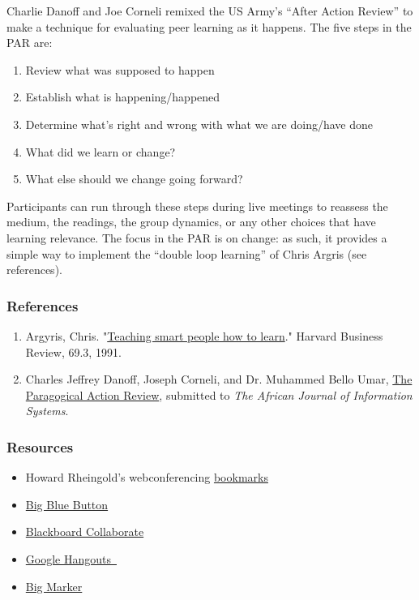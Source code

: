 Charlie Danoff and Joe Corneli remixed the US Army's ``After Action
Review'' to make a technique for evaluating peer learning as it happens.
The five steps in the PAR are:

\begin{enumerate}
\item
  Review what was supposed to happen
\item
  Establish what is happening/happened
\item
  Determine what's right and wrong with what we are doing/have done
\item
  What did we learn or change?
\item
  What else should we change going forward?
\end{enumerate}

Participants can run through these steps during live meetings to
reassess the medium, the readings, the group dynamics, or any other
choices that have learning relevance. The focus in the PAR is on change:
as such, it provides a simple way to implement the ``double loop
learning'' of Chris Argris (see references).

\subsubsection{\textbf{References}}

\begin{enumerate}
\item
  Argyris, Chris.
  "\href{http://pds8.egloos.com/pds/200805/20/87/chris\_argyris\_learning.pdf}{Teaching
  smart people how to learn}." Harvard Business Review, 69.3, 1991.
\item
  Charles Jeffrey Danoff, Joseph Corneli, and Dr. Muhammed Bello Umar,
  \href{http://metameso.org/~joe/docs/The-Paragogical-Action-Review.pdf}{The
  Paragogical Action Review}, submitted to \emph{The African Journal of
  Information Systems}.
\end{enumerate}

\subsubsection{\textbf{Resources}}

\begin{itemize}
\item
  Howard Rheingold's webconferencing
  \href{http://delicious.com/hrheingold/webconferencing}{bookmarks}
\item
  \href{http://www.bigbluebutton.org/}{Big Blue Button}
\item
  \href{http://www.blackboard.com/platforms/collaborate/overview.aspx}{Blackboard
  Collaborate}
\item
  \href{http://www.google.com/+/learnmore/hangouts/}{Google Hangouts~}
\item
  \href{http://www.bigmarker.com/about}{Big Marker}
\end{itemize}
